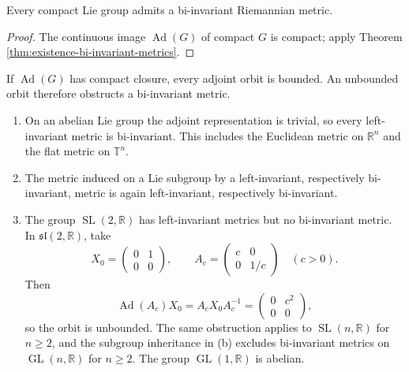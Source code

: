 \begin{corollary}
\label{cor:compact-lie-group-bi-invariant-metric}
Every compact Lie group admits a bi-invariant Riemannian metric.
\end{corollary}
\begin{proof}
\sketch The continuous image $\operatorname{Ad}(G)$ of compact $G$ is compact;
apply Theorem \ref{thm:existence-bi-invariant-metrics}.
\end{proof}

If $\operatorname{Ad}(G)$ has compact closure, every adjoint orbit is bounded.
An unbounded orbit therefore obstructs a bi-invariant metric.

\begin{example}
\label{ex:invariant-metrics-lie-groups}

\begin{enumerate}[label=(\alph*)]
\item On an abelian Lie group the adjoint representation is trivial, so every
left-invariant metric is bi-invariant. This includes the Euclidean metric on
$\mathbb R^n$ and the flat metric on $\mathbb T^n$.

\item The metric induced on a Lie subgroup by a left-invariant, respectively
bi-invariant, metric is again left-invariant, respectively bi-invariant.

\item The group $\operatorname{SL}(2,\mathbb R)$ has left-invariant metrics but
no bi-invariant metric. In
$\mathfrak{sl}(2,\mathbb R)$, take
\[
X_0=\begin{pmatrix}0&1\\0&0\end{pmatrix},\qquad
A_c=\begin{pmatrix}c&0\\0&1/c\end{pmatrix}\quad(c>0).
\]
Then
\[
\operatorname{Ad}(A_c)X_0=A_cX_0A_c^{-1}
=\begin{pmatrix}0&c^2\\0&0\end{pmatrix},
\]
so the orbit is unbounded. The same obstruction applies to
$\operatorname{SL}(n,\mathbb R)$ for $n\ge2$, and the subgroup inheritance in
(b) excludes bi-invariant metrics on $\operatorname{GL}(n,\mathbb R)$ for
$n\ge2$. The group $\operatorname{GL}(1,\mathbb R)$ is abelian.


\end{enumerate}
\end{example}
